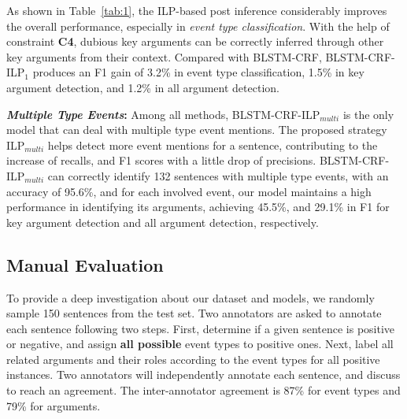 As shown in Table~\ref{tab:1}, the ILP-based post inference considerably improves the overall performance, especially in \textit{event type classification}. With the help of constraint \textbf{C4},  dubious key arguments can be correctly inferred through other key arguments from their context. Compared with BLSTM-CRF, BLSTM-CRF-ILP$_1$ produces an F1 gain of 3.2\% in event type classification, 1.5\% in key argument detection, and 1.2\% in all argument detection. %

\vspace{2mm}\noindent\textbf{\emph{Multiple Type Events}:}
Among all methods, BLSTM-CRF-ILP$_{multi}$ is the only model that can deal with multiple type event mentions. %
The proposed strategy ILP$_{multi}$ helps detect more event mentions for a sentence, contributing to the increase of recalls, and F1 scores with a little drop of precisions.
BLSTM-CRF-ILP$_{multi}$ can correctly identify 132 sentences with multiple type events,
with an accuracy of 95.6\%, and for each involved event, our model maintains a high
performance in identifying its arguments, achieving 45.5\%, and 29.1\% in F1 for key argument detection and all argument detection, respectively.

\subsection{Manual Evaluation}\label{manualeve}
To provide a deep investigation about our dataset and models, we randomly sample 150 sentences from the test set. Two annotators are asked
to annotate each sentence following two steps. First, determine if a given sentence is positive or negative, and assign \textbf{all
possible} event types to positive ones. Next, label all related arguments and their roles according to the event types for all positive
instances. Two annotators will independently annotate each sentence, and discuss to reach an agreement. The inter-annotator agreement is
87\% for event types and 79\% for arguments.


